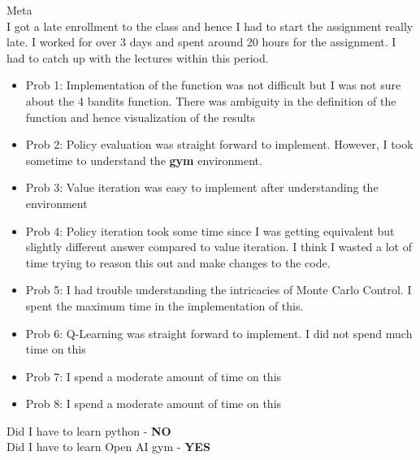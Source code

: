 \documentclass[12pt]{article}
\newenvironment{problem}[2][\large Problem]{\begin{trivlist}
\item[\hskip \labelsep {\bfseries #1}\hskip \labelsep {\bfseries #2.}]}{\end{trivlist}}
\begin{document}
\begin{problem} {9} Meta\\
I got a late enrollment to the class and hence I had to start the assignment really late. I worked for over 3 days and spent around 20 hours for the assignment. I had to catch up with the lectures within this period. 

\begin{itemize}
	\item Prob 1: Implementation of the function was not difficult but I was not sure about the 4 bandits function. There was ambiguity in the definition of the function and hence visualization of the results
	\item Prob 2: Policy evaluation was straight forward to implement. However, I took sometime to understand the \textbf{gym} environment.
	\item Prob 3: Value iteration was easy to implement after understanding the environment
	\item Prob 4: Policy iteration took some time since I was getting equivalent but slightly different answer compared to value iteration. I think I wasted a lot of time trying to reason this out and make changes to the code. 
	\item Prob 5: I had trouble understanding the intricacies of Monte Carlo Control. I spent the maximum time in the implementation of this. 
	\item Prob 6: Q-Learning was straight forward to implement. I did not spend much time on this
	\item Prob 7: I spend a moderate amount of time on this
	\item Prob 8: I spend a moderate amount of time on this
	
\end{itemize}

Did I have to learn python - \textbf{NO}\\
Did I have to learn Open AI gym - \textbf{YES}\\


\end{problem}
%
\end{document}
